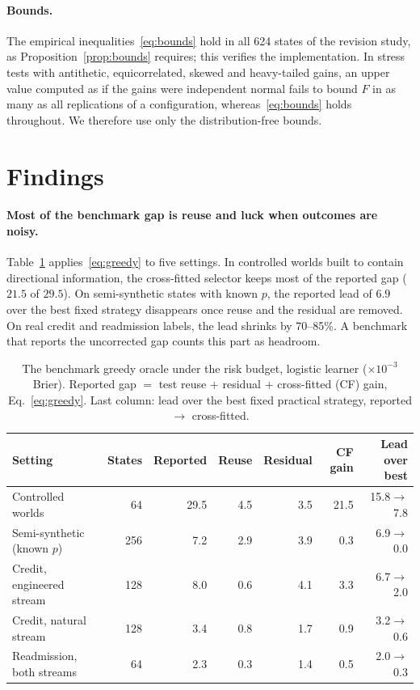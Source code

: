 \documentclass[runningheads]{llncs}
\begin{document}
\paragraph{Bounds.} The empirical inequalities~\eqref{eq:bounds} hold in all 624 states of the revision study, as Proposition~\ref{prop:bounds} requires; this verifies the implementation. In stress tests with antithetic, equicorrelated, skewed and heavy-tailed gains, an upper value computed as if the gains were independent normal fails to bound $F$ in as many as all replications of a configuration, whereas~\eqref{eq:bounds} holds throughout. We therefore use only the distribution-free bounds.

\section{Findings}
\label{sec:findings}
\paragraph{Most of the benchmark gap is reuse and luck when outcomes are noisy.} Table~\ref{tab:known} applies~\eqref{eq:greedy} to five settings. In controlled worlds built to contain directional information, the cross-fitted selector keeps most of the reported gap ($21.5$ of $29.5$). On semi-synthetic states with known $p$, the reported lead of $6.9$ over the best fixed strategy disappears once reuse and the residual are removed. On real credit and readmission labels, the lead shrinks by 70--85\%. A benchmark that reports the uncorrected gap counts this part as headroom.

\begin{table}[t]
\caption{The benchmark greedy oracle under the risk budget, logistic learner ($\times10^{-3}$ Brier). Reported gap $=$ test reuse $+$ residual $+$ cross-fitted (CF) gain, Eq.~\eqref{eq:greedy}. Last column: lead over the best fixed practical strategy, reported $\to$ cross-fitted.}
\label{tab:known}
\centering\scriptsize
\setlength{\tabcolsep}{3.5pt}
\begin{tabular}{lrrrrrr}
\toprule
Setting & States & Reported & Reuse & Residual & CF gain & Lead over best \\
\midrule
Controlled worlds & 64 & 29.5 & 4.5 & 3.5 & 21.5 & 15.8$\to$7.8 \\
Semi-synthetic (known $p$) & 256 & 7.2 & 2.9 & 3.9 & 0.3 & 6.9$\to$0.0 \\
Credit, engineered stream & 128 & 8.0 & 0.6 & 4.1 & 3.3 & 6.7$\to$2.0 \\
Credit, natural stream & 128 & 3.4 & 0.8 & 1.7 & 0.9 & 3.2$\to$0.6 \\
Readmission, both streams & 64 & 2.3 & 0.3 & 1.4 & 0.5 & 2.0$\to$0.3 \\
\bottomrule
\end{tabular}
\end{table}
\end{document}

